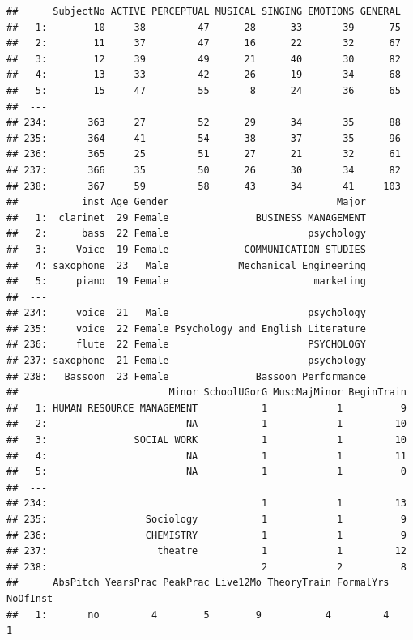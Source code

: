 \documentclass[]{book}
\theoremstyle{definition}
\theoremstyle{definition}
\theoremstyle{definition}
\theoremstyle{remark}
\begin{document}
\begin{verbatim}
##      SubjectNo ACTIVE PERCEPTUAL MUSICAL SINGING EMOTIONS GENERAL
##   1:        10     38         47      28      33       39      75
##   2:        11     37         47      16      22       32      67
##   3:        12     39         49      21      40       30      82
##   4:        13     33         42      26      19       34      68
##   5:        15     47         55       8      24       36      65
##  ---                                                             
## 234:       363     27         52      29      34       35      88
## 235:       364     41         54      38      37       35      96
## 236:       365     25         51      27      21       32      61
## 237:       366     35         50      26      30       34      82
## 238:       367     59         58      43      34       41     103
##           inst Age Gender                             Major
##   1:  clarinet  29 Female               BUSINESS MANAGEMENT
##   2:      bass  22 Female                        psychology
##   3:     Voice  19 Female             COMMUNICATION STUDIES
##   4: saxophone  23   Male            Mechanical Engineering
##   5:     piano  19 Female                         marketing
##  ---                                                       
## 234:     voice  21   Male                        psychology
## 235:     voice  22 Female Psychology and English Literature
## 236:     flute  22 Female                        PSYCHOLOGY
## 237: saxophone  21 Female                        psychology
## 238:   Bassoon  23 Female               Bassoon Performance
##                          Minor SchoolUGorG MuscMajMinor BeginTrain
##   1: HUMAN RESOURCE MANAGEMENT           1            1          9
##   2:                        NA           1            1         10
##   3:               SOCIAL WORK           1            1         10
##   4:                        NA           1            1         11
##   5:                        NA           1            1          0
##  ---                                                              
## 234:                                     1            1         13
## 235:                 Sociology           1            1          9
## 236:                 CHEMISTRY           1            1          9
## 237:                   theatre           1            1         12
## 238:                                     2            2          8
##      AbsPitch YearsPrac PeakPrac Live12Mo TheoryTrain FormalYrs NoOfInst
##   1:       no         4        5        9           4         4        1

\end{verbatim}
\end{document}
